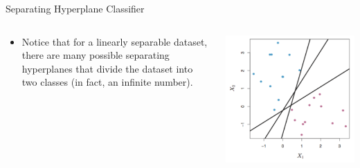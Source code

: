 \begin{frame}{Separating Hyperplane Classifier}
\begin{columns}
  \begin{column}{0.55\textwidth}
    \begin{itemize}
      \item Notice that for a linearly separable dataset, there are many possible separating hyperplanes that divide the dataset into two classes (in fact, an infinite number).
    \end{itemize}
  \end{column}
  \begin{column}{0.45\textwidth}
    \centering
    \includegraphics[width=\linewidth]{images/support-vector-machines/support-vector-machines-4.png}
  \end{column}
\end{columns}
\end{frame}
